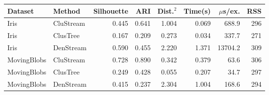 \begin{tabular}{llrrrrrr}
\toprule
Dataset & Method & Silhouette & ARI & Dist.$^2$ & Time(s) & $\mu$s/ex. & RSS \\
\midrule
Iris & CluStream & 0.445 & 0.641 & 1.004 & 0.069 & 688.9 & 296 \\
Iris & ClusTree & 0.167 & 0.209 & 0.273 & 0.034 & 337.7 & 271 \\
Iris & DenStream & 0.590 & 0.455 & 2.220 & 1.371 & 13704.2 & 309 \\
MovingBlobs & CluStream & 0.728 & 0.890 & 0.342 & 0.379 & 63.6 & 306 \\
MovingBlobs & ClusTree & 0.249 & 0.428 & 0.055 & 0.207 & 34.7 & 297 \\
MovingBlobs & DenStream & 0.415 & 0.237 & 2.304 & 1.004 & 168.6 & 294 \\
\bottomrule
\end{tabular}
